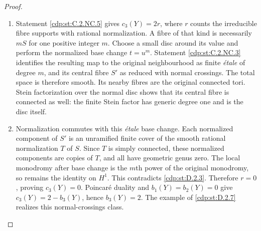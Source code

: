 \begin{proof}

\begin{enumerate}[label={$\langle1\rangle$\arabic*.},leftmargin=*]
\item Statement \ref{cdp:st:C.2.NC.5} gives $c_3(Y)=2r$, where $r$ counts the
irreducible fibre supports with rational normalization. A fibre
of that kind is necessarily $mS$ for one positive integer $m$.
Choose a small disc around its value and perform the normalized
base change $t=u^m$. Statement \ref{cdp:st:C.2.NC.3} identifies the resulting
map to the original neighbourhood as finite \emph{\'etale} of
degree $m$, and its central fibre $S'$ as reduced with normal
crossings. The total space is therefore smooth. Its nearby
fibres are the original connected tori. Stein factorization
over the normal disc shows that its central fibre is connected
as well: the finite Stein factor has generic degree one and is
the disc itself.

\item Normalization commutes with this \emph{\'etale} base change.
Each normalized component of $S'$ is an unramified finite cover
of the smooth rational normalization $T$ of $S$. Since $T$ is
simply connected, these normalized components are copies of
$T$, and all have geometric genus zero. The local monodromy
after base change is the $m$th power of the original monodromy,
so remains the identity on $H^1$. This contradicts \ref{cdp:st:D.2.3}.
Therefore $r=0$, proving $c_3(Y)=0$. Poincar\'e duality and
$b_1(Y)=b_2(Y)=0$ give $c_3(Y)=2-b_3(Y)$, hence $b_3(Y)=2$.
The example of \ref{cdp:st:D.2.7} realizes this normal-crossings class.

\end{enumerate}
\end{proof}
